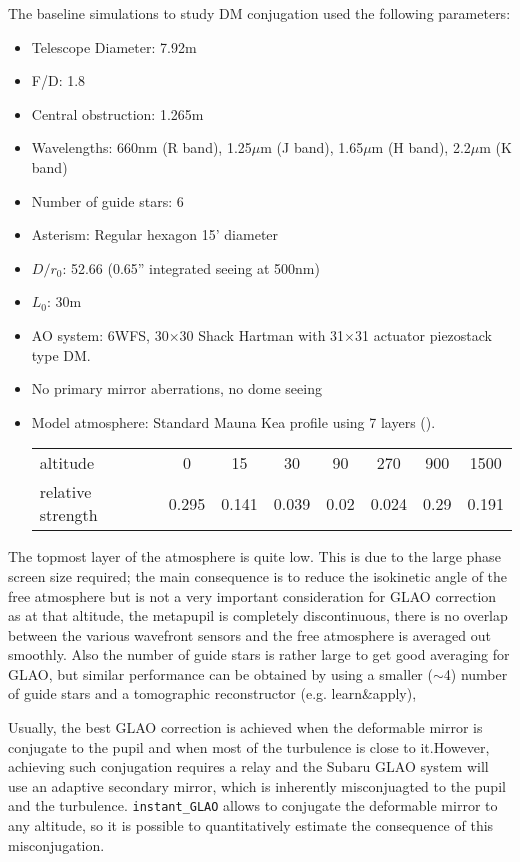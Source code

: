 \documentclass[aas_macros,10pt]{article}
\begin{document}
The baseline simulations to study DM conjugation used the following 
parameters:
\begin{itemize}
\item Telescope Diameter: 7.92m
\item F/D: 1.8
\item Central obstruction: 1.265m
\item Wavelengths: 660nm (R band), 1.25$\mu$m (J band), 1.65$\mu$m (H band), 2.2$\mu$m (K band)
\item Number of guide stars: 6
\item Asterism: Regular hexagon 15' diameter
\item $D/r_0$: 52.66 (0.65'' integrated seeing at 500nm)
\item $L_0$: 30m
\item AO system: 6WFS, 30$\times$30 Shack Hartman with 31$\times$31 actuator piezostack type DM.
\item No primary mirror aberrations, no dome seeing
\item Model atmosphere: Standard Mauna Kea profile using 7 layers  (\cite{chun09}).

\begin{tabular}{lccccccc}
altitude & 0 & 15 & 30 & 90 & 270 & 900 & 1500 \\
relative strength & 0.295 & 0.141 & 0.039 & 0.02 & 0.024 & 0.29 & 0.191 \\
\end{tabular}

\end{itemize}

The topmost layer of the atmosphere is quite low. This is due to the 
large phase screen size required; the main consequence is to reduce the 
isokinetic angle of the free atmosphere but is not a very important 
consideration for GLAO correction as at that altitude, the metapupil 
is completely discontinuous, there is no overlap between the various 
wavefront sensors and the free atmosphere is averaged out smoothly. 
Also the number of guide stars is rather large to get good 
averaging for GLAO, but similar performance can be obtained by using a 
smaller ($\sim$4) number of guide stars and a tomographic reconstructor 
(e.g. learn\&apply), 

Usually, the best GLAO correction is achieved when the deformable mirror is conjugate to 
the pupil and when most of the turbulence is close to it.However, achieving such 
conjugation requires a relay and the Subaru GLAO system will use an adaptive secondary 
mirror, which is inherently misconjuagted to the pupil and the turbulence. \texttt{instant\_GLAO} 
allows to conjugate the deformable mirror to any altitude, so it is possible to quantitatively 
estimate the consequence of this misconjugation.
\end{document}
